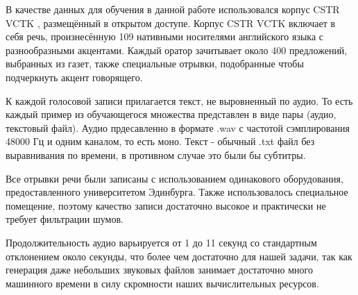 \documentclass[../diploma.tex]{subfiles}
\begin{document}
В качестве данных для обучения в данной работе использовался корпус CSTR VCTK \cite{online:vctk}, размещённый в открытом доступе.
Корпус CSTR VCTK включает в себя речь, произнесённую 109 нативными носителями английского языка с разнообразными акцентами. 
Каждый оратор зачитывает около 400 предложений, выбранных из газет, также специальные отрывки, подобранные чтобы подчеркнуть акцент говорящего. 

К каждой голосовой записи прилагается текст, не выровненный по аудио. То есть каждый пример из обучающегося множества представлен в виде пары (аудио, текстовый файл). 
Аудио прдесавленно в формате .wav с частотой сэмплирования 48000 Гц и одним каналом, то есть моно. Текст - обычный .txt файл без выравнивания по времени, в противном случае это были бы субтитры.

Все отрывки речи были записаны с использованием одинакового оборудования, предоставленного университетом Эдинбурга. Также использовалось специальное помещение, поэтому качество записи достаточно высокое и практически не требует фильтрации шумов.

Продолжительность аудио варьируется от 1 до 11 секунд со стандартным отклонением около секунды, что более чем достаточно для нашей задачи, так как генерация даже небольших звуковых файлов занимает достаточно много машинного времени в силу скромности наших вычислительных ресурсов.
\end{document}
